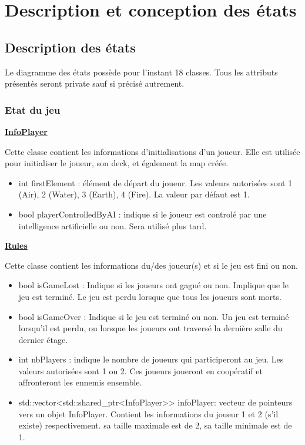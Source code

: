 \section{Description et conception des états}

\subsection{Description des états}

Le diagramme des états possède pour l'instant 18 classes. Tous les attributs présentés seront private sauf si précisé autrement.

\subsubsection{Etat du jeu}

\underline{\textbf{InfoPlayer}}
\par Cette classe contient les informations d'initialisations d'un joueur. Elle est utilisée pour initialiser le joueur, son deck, et également la map créée.

\begin{itemize}
        \item int firstElement : élément de départ du joueur. Les valeurs autorisées sont 1 (Air), 2 (Water), 3 (Earth), 4 (Fire). La valeur par défaut est 1. 
        \item  bool playerControlledByAI : indique si le joueur est controlé par une intelligence artificielle ou non. Sera utilisé plus tard.
\end{itemize}

\underline{\textbf{Rules}}
\par Cette classe contient les informations du/des joueur(s) et si le jeu est fini ou non.
\begin{itemize}
    \item bool isGameLost : Indique si les joueurs ont gagné ou non. Implique que le jeu est terminé. Le jeu est perdu lorsque que tous les joueurs sont morts.
    \item bool isGameOver : Indique si le jeu est terminé ou non. Un jeu est terminé lorsqu'il est perdu, ou lorsque les joueurs ont traversé la dernière salle du dernier étage.
    \item int nbPlayers : indique le nombre de joueurs qui participeront au jeu. Les valeurs autorisées sont 1 ou 2. Ces joueurs joueront en coopératif et affronteront les ennemis ensemble.
    \item  std::vector<std::shared\_ptr<InfoPlayer>> infoPlayer: vecteur de pointeurs vers un objet InfoPlayer. Contient les informations du joueur 1 et 2 (s'il existe) respectivement. sa taille maximale est de 2, sa taille minimale est de 1.
\end{itemize}

